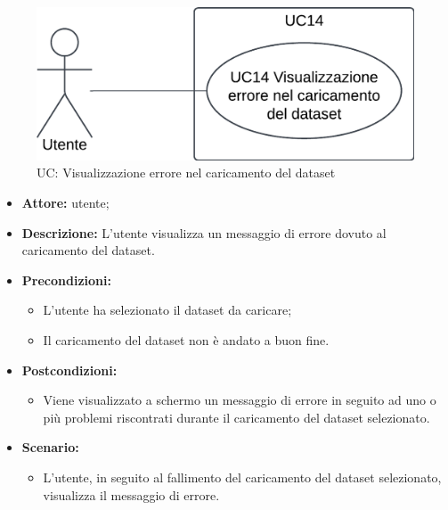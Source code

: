 \pagebreak


\begin{figure}[h!]\centering
    \includegraphics[scale=0.7]{template/images/UC14.png}
    \caption{UC: Visualizzazione errore nel caricamento del dataset}
\end{figure}
\begin{itemize}    
    \item \textbf{Attore:} utente;
    \item \textbf{Descrizione:} L'utente visualizza un messaggio di errore dovuto al caricamento del dataset.
    \item \textbf{Precondizioni:}    
        \begin{itemize}
            \item L'utente ha selezionato il dataset da caricare;
            \item Il caricamento del dataset non è andato a buon fine.
        \end{itemize}    
    \item \textbf{Postcondizioni:}
        \begin{itemize}
            \item Viene visualizzato a schermo un messaggio di errore in seguito ad uno o più problemi riscontrati durante il caricamento del dataset selezionato.
        \end{itemize}    
    \item \textbf{Scenario:} 
        \begin{itemize}
            \item L'utente, in seguito al fallimento del caricamento del dataset selezionato, visualizza il messaggio di errore.
        \end{itemize}
\end{itemize}
